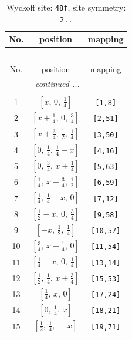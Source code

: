 \documentclass[fleqn,8pt]{jsarticle}
\begin{document}
\begin{longtable}{ccc}
\caption{Wyckoff site: {\tt 48f}, site symmetry: {\tt 2..}}
 \\
 \hline \hline
No. & position & mapping \\ \hline \endfirsthead

\multicolumn{2}{l}{\tablename\ \thetable{}} \\
 \hline \hline
No. & position & mapping \\ \hline \endhead

 \hline \hline
\multicolumn{2}{r}{\footnotesize\it continued ...} \\ \endfoot

 \hline \hline
\multicolumn{2}{r}{} \\ \endlastfoot

1 & $\left[ x,\, 0,\, \frac{1}{4} \right]$ & {\tt [1,8]} \\ \hline
2 & $\left[ x + \frac{1}{4},\, 0,\, \frac{3}{4} \right]$ & {\tt [2,51]} \\ \hline
3 & $\left[ x + \frac{3}{4},\, \frac{1}{2},\, \frac{1}{4} \right]$ & {\tt [3,50]} \\ \hline
4 & $\left[ 0,\, \frac{1}{4},\, \frac{1}{4} - x \right]$ & {\tt [4,16]} \\ \hline
5 & $\left[ 0,\, \frac{3}{4},\, x + \frac{1}{4} \right]$ & {\tt [5,63]} \\ \hline
6 & $\left[ \frac{1}{4},\, x + \frac{3}{4},\, \frac{1}{2} \right]$ & {\tt [6,59]} \\ \hline
7 & $\left[ \frac{1}{4},\, \frac{1}{4} - x,\, 0 \right]$ & {\tt [7,12]} \\ \hline
8 & $\left[ \frac{1}{2} - x,\, 0,\, \frac{3}{4} \right]$ & {\tt [9,58]} \\ \hline
9 & $\left[ - x,\, \frac{1}{2},\, \frac{1}{4} \right]$ & {\tt [10,57]} \\ \hline
10 & $\left[ \frac{3}{4},\, x + \frac{1}{4},\, 0 \right]$ & {\tt [11,54]} \\ \hline
11 & $\left[ \frac{1}{4} - x,\, 0,\, \frac{1}{4} \right]$ & {\tt [13,14]} \\ \hline
12 & $\left[ \frac{1}{2},\, \frac{1}{4},\, x + \frac{3}{4} \right]$ & {\tt [15,53]} \\ \hline
13 & $\left[ \frac{1}{4},\, x,\, 0 \right]$ & {\tt [17,24]} \\ \hline
14 & $\left[ 0,\, \frac{1}{4},\, x \right]$ & {\tt [18,21]} \\ \hline
15 & $\left[ \frac{1}{2},\, \frac{1}{4},\, - x \right]$ & {\tt [19,71]} \\ \hline

\end{longtable}
\end{document}
